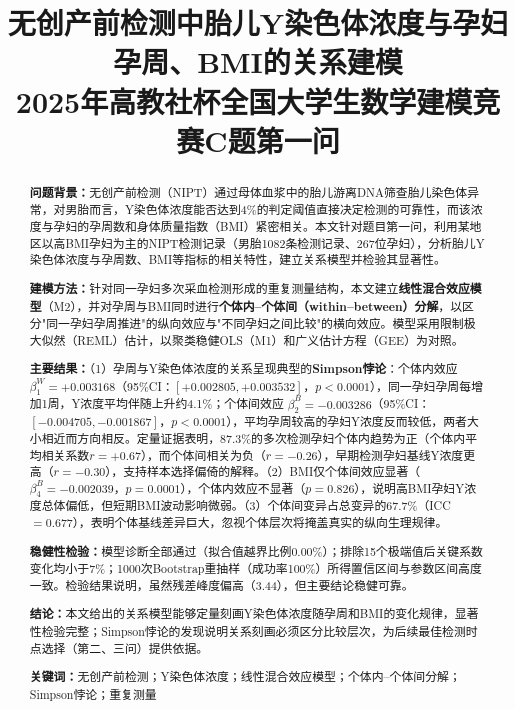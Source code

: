 \documentclass[12pt,a4paper]{ctexart}
\title{\heiti 无创产前检测中胎儿Y染色体浓度与孕妇孕周、BMI的关系建模\\[4pt]
\large 2025年高教社杯全国大学生数学建模竞赛C题第一问}
\author{}
\date{}
\begin{document}
\maketitle

\begin{abstract}
\noindent\textbf{问题背景：}无创产前检测（NIPT）通过母体血浆中的胎儿游离DNA筛查胎儿染色体异常，对男胎而言，Y染色体浓度能否达到4\%的判定阈值直接决定检测的可靠性，而该浓度与孕妇的孕周数和身体质量指数（BMI）紧密相关。本文针对题目第一问，利用某地区以高BMI孕妇为主的NIPT检测记录（男胎1082条检测记录、267位孕妇），分析胎儿Y染色体浓度与孕周数、BMI等指标的相关特性，建立关系模型并检验其显著性。

\noindent\textbf{建模方法：}针对同一孕妇多次采血检测形成的重复测量结构，本文建立\textbf{线性混合效应模型}（M2），并对孕周与BMI同时进行\textbf{个体内--个体间（within--between）分解}，以区分"同一孕妇孕周推进"的纵向效应与"不同孕妇之间比较"的横向效应。模型采用限制极大似然（REML）估计，以聚类稳健OLS（M1）和广义估计方程（GEE）为对照。

\noindent\textbf{主要结果：}（1）孕周与Y染色体浓度的关系呈现典型的\textbf{Simpson悖论}：个体内效应 $\beta_1^W=+0.003168$（95\%CI：$[+0.002805,+0.003532]$，$p<0.0001$），同一孕妇孕周每增加1周，Y浓度平均伴随上升约4.1\%；个体间效应 $\beta_2^B=-0.003286$（95\%CI：$[-0.004705,-0.001867]$，$p<0.0001$），平均孕周较高的孕妇Y浓度反而较低，两者大小相近而方向相反。定量证据表明，87.3\%的多次检测孕妇个体内趋势为正（个体内平均相关系数$r=+0.67$），而个体间相关为负（$r=-0.26$），早期检测孕妇基线Y浓度更高（$r=-0.30$），支持样本选择偏倚的解释。（2）BMI仅个体间效应显著（$\beta_4^B=-0.002039$，$p=0.0001$），个体内效应不显著（$p=0.826$），说明高BMI孕妇Y浓度总体偏低，但短期BMI波动影响微弱。（3）个体间变异占总变异的67.7\%（ICC$=0.677$），表明个体基线差异巨大，忽视个体层次将掩盖真实的纵向生理规律。

\noindent\textbf{稳健性检验：}模型诊断全部通过（拟合值越界比例0.00\%）；排除15个极端值后关键系数变化均小于7\%；1000次Bootstrap重抽样（成功率100\%）所得置信区间与参数区间高度一致。检验结果说明，虽然残差峰度偏高（3.44），但主要结论稳健可靠。

\noindent\textbf{结论：}本文给出的关系模型能够定量刻画Y染色体浓度随孕周和BMI的变化规律，显著性检验完整；Simpson悖论的发现说明关系刻画必须区分比较层次，为后续最佳检测时点选择（第二、三问）提供依据。

\vspace{1em}
\noindent\textbf{关键词：}无创产前检测；Y染色体浓度；线性混合效应模型；个体内--个体间分解；Simpson悖论；重复测量
\end{abstract}
\end{document}

